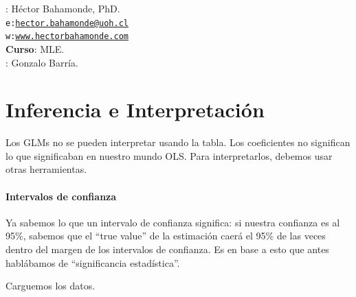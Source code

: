 \documentclass[onesided]{article}\usepackage[]{graphicx}\usepackage[]{color}
\begin{document}











\hspace{-5mm}{\bf Profesor}: H\'ector Bahamonde, PhD.\\
\texttt{e:}\href{mailto:hector.bahamonde@uoh.cl}{\texttt{hector.bahamonde@uoh.cl}}\\
\texttt{w:}\href{http://www.hectorbahamonde.com}{\texttt{www.hectorbahamonde.com}}\\
{\bf Curso}: MLE.\\
\hspace{-5mm}{\bf TA}: Gonzalo Barr\'ia.

\section{Inferencia e Interpretaci\'on}

Los GLMs no se pueden interpretar usando la tabla. Los coeficientes no significan lo que significaban en nuestro mundo OLS. Para interpretarlos, debemos usar otras herramientas. 


\paragraph{Intervalos de confianza}

Ya sabemos lo que un intervalo de confianza significa: si nuestra confianza es al 95\%, sabemos que el ``true value'' de la estimaci\'on caer\'a el 95\% de las veces dentro del margen de los intervalos de confianza. Es en base a esto que antes habl\'abamos de ``significancia estad\'istica''.

Carguemos los datos.
\end{document}
